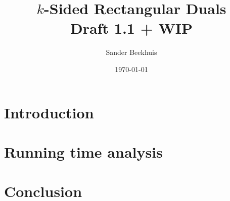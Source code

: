 




%


\title{$k$-Sided Rectangular Duals \\ \normalsize Draft 1.1 + WIP}
\author{Sander Beekhuis}
\date{\today} %



\maketitle

\section{Introduction}















\section{Running time analysis}
\section{Conclusion}

\listoffixmes

%
%
%


\printbibliography

